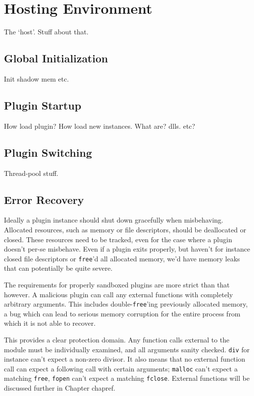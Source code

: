\chapter {Hosting Environment}

The `host'. Stuff about that.


\section {Global Initialization}

Init shadow mem etc.


\section {Plugin Startup}

How load plugin? How load new instances. What are? dlls. etc?


\section {Plugin Switching}

Thread-pool stuff.


\section {Error Recovery}

Ideally a plugin instance should shut down gracefully when misbehaving.
Allocated resources, such as memory or file descriptors, should be deallocated
or closed. These resources need to be tracked, even for the case where a plugin
doesn't per-se misbehave. Even if a plugin exits properly, but haven't for
instance closed file descriptors or \texttt{free}'d all allocated memory, we'd
have memory leaks that can potentially be quite severe.

The requirements for properly sandboxed plugins are more strict than that
however. A malicious plugin can call any external functions with completely
arbitrary arguments. This includes double-\texttt{free}'ing previously
allocated memory, a bug which can lead to serious memory corruption for the
entire process from which it is not able to recover.

This provides a clear protection domain. Any function calls external to the
module must be individually examined, and all arguments sanity checked.
\texttt{div} for instance can't expect a non-zero divisor. It also means that
no external function call can expect a following call with certain arguments;
\texttt{malloc} can't expect a matching \texttt{free}, \texttt{fopen} can't
expect a matching \texttt{fclose}. External functions will be discussed further
in Chapter {chapref}. 

